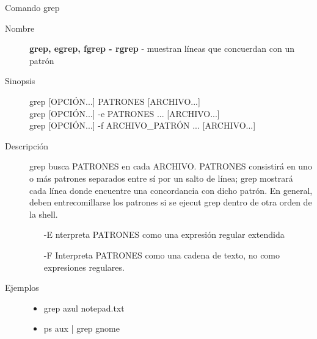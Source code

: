 \begin{frame}[c]{Comando grep}
  \begin{description}
    \item[Nombre]
      \textbf{grep, egrep, fgrep - rgrep} - muestran líneas que concuerdan
      con un patrón

    \vspace{\baselineskip}
    \item[Sinopsis]
      grep [OPCIÓN...] PATRONES [ARCHIVO...] \\
      grep [OPCIÓN...] -e PATRONES ... [ARCHIVO...] \\
      grep [OPCIÓN...] -f ARCHIVO_PATRÓN ... [ARCHIVO...]
      
    \vspace{\baselineskip}
    \item[Descripción]
      grep busca PATRONES en cada ARCHIVO. PATRONES consistirá en uno o más
      patrones separados entre sí por un salto de línea; grep mostrará cada
      línea donde encuentre una concordancia con dicho patrón. En general,
      deben entrecomillarse los patrones si se ejecut grep dentro de otra
      orden de la shell.

      \begin{itemize}
        \item [-E] nterpreta PATRONES como una expresión regular extendida 
        \item [-F] Interpreta PATRONES como una cadena de texto, no como expresiones regulares.
      \end{itemize}

    \vspace{\baselineskip}
    \item[Ejemplos]
      \begin{itemize}
        \item grep azul notepad.txt
        \item ps aux | grep gnome
      \end{itemize}
  \end{description}
\end{frame}

